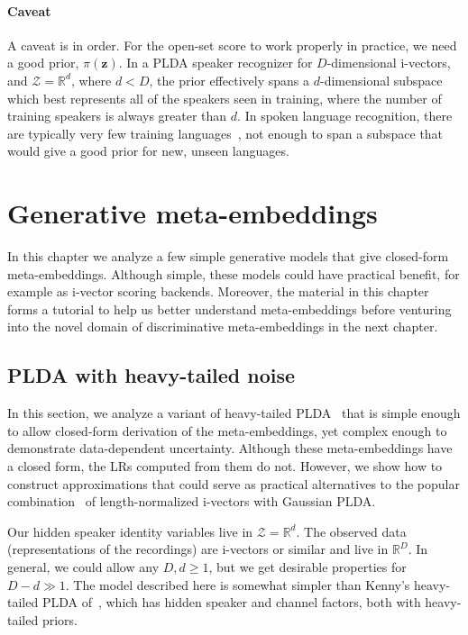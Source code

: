 \documentclass[a4paper,oneside,12pt,english]{report}
\def\zvec{\mathbf{z}}
\def\R{\mathbb{R}}
\def\Zset{\mathcal{Z}}
\def\Zset{\mathcal{Z}}
\begin{document}
\subsubsection{Caveat} A caveat is in order. For the open-set score to work properly in practice, we need a good prior, $\pi(\zvec)$. In a PLDA speaker recognizer for $D$-dimensional i-vectors, and $\Zset=\R^d$, where $d<D$, the prior effectively spans a $d$-dimensional subspace which best represents all of the speakers seen in training, where the number of training speakers is always greater than $d$. In spoken language recognition, there are typically very few training languages~\cite{LRE_NIST_Odyssey2014}, not enough to span a subspace that would give a good prior for new, unseen languages.   


\chapter{Generative meta-embeddings}
\label{chap:generative}
In this chapter we analyze a few simple generative models that give closed-form meta-embeddings. Although simple, these models could have practical benefit, for example as i-vector scoring backends. Moreover, the material in this chapter forms a tutorial to help us better understand meta-embeddings before venturing into the novel domain of discriminative meta-embeddings in the next chapter.


\section{PLDA with heavy-tailed noise}
\label{sec:TPLDA}
In this section, we analyze a variant of heavy-tailed PLDA~\cite{ht-plda} that is simple enough to allow closed-form derivation of the meta-embeddings, yet complex enough to demonstrate data-dependent uncertainty. Although these meta-embeddings have a closed form, the LRs computed from them do not. However, we show how to construct approximations that could serve as practical alternatives to the popular combination~\cite{Dani_length_norm} of length-normalized i-vectors with Gaussian PLDA.  

Our hidden speaker identity variables live in $\Zset=\R^d$. The observed data (representations of the recordings) are i-vectors or similar and live in $\R^D$. In general, we could allow any $D,d\ge1$, but we get desirable properties for $D-d\gg 1$. The model described here is somewhat simpler than Kenny's heavy-tailed PLDA of~\cite{ht-plda}, which has hidden speaker and channel factors, both with heavy-tailed priors. 
\end{document}
